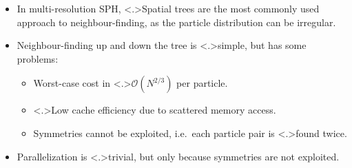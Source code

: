\documentclass{beamer}
\begin{document}
    \begin{frame}
    
        \pause
    
        \begin{columns}
        
            \begin{itemize}

                \item<+-> In multi-resolution SPH,
                    \alert<.>{\alert<+>{Spatial trees}} are the most commonly used
                    approach to neighbour-finding, as the particle distribution
                    can be irregular.
                    
                \item<+-> Neighbour-finding up and down the tree is
                    \alert<.>{\alert<+>{simple}}, but has some problems:
                    
                    \begin{itemize}
                        \item<+-> Worst-case cost in 
                            \alert<.>{$\mathcal O(N^{2/3})$} per particle.
                        \item<+-> \alert<.>{Low cache efficiency} due to scattered
                            memory access.
                        \item<+-> Symmetries cannot be exploited, i.e.~each
                            particle pair is \alert<.>{found twice}.
                    \end{itemize}
                    
                \item<+-> Parallelization is \alert<.>{trivial}, but only because
                    symmetries are not exploited.

            \end{itemize}
            
            
        \end{columns}
    \end{frame}
    
\end{document}
